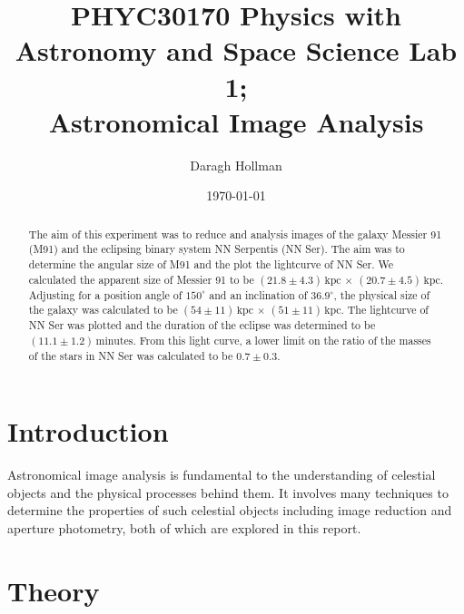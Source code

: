 \documentclass[%
reprint,
amsmath,amssymb,
aps,
]{revtex4-2}
\begin{document}
	
	
	\title{PHYC30170 Physics with Astronomy and Space Science Lab 1;\\Astronomical Image Analysis}%
	
	\author{Daragh Hollman}
	
	\date{\today}
	
	\begin{abstract}
		The aim of this experiment was to reduce and analysis images of the galaxy Messier 91 (M91) and the eclipsing binary system NN Serpentis (NN Ser). The aim was to determine the angular size of M91 and the plot the lightcurve of NN Ser. We calculated the apparent size of Messier 91 to be $\left(21.8 \pm 4.3\right) \,\text{kpc}$ $\times$ $\left(20.7 \pm 4.5\right) \,\text{kpc}$. Adjusting for a position angle of $150^\circ$ and an inclination of $36.9^\circ$, the physical size of the galaxy was calculated to be $\left(54 \pm 11\right) \,\text{kpc}$ $\times$ $\left(51 \pm 11\right) \,\text{kpc}$. The lightcurve of NN Ser was plotted and the duration of the eclipse was determined to be $(11.1 \pm 1.2)\,\text{minutes}$. From this light curve, a lower limit on the ratio of the masses of the stars in NN Ser was calculated to be $0.7 \pm 0.3$.
	\end{abstract}

	\maketitle
	
	\section{Introduction}

		Astronomical image analysis is fundamental to the understanding of celestial objects and the physical processes behind them. It involves many techniques to determine the properties of such celestial objects including image reduction and aperture photometry, both of which are explored in this report.
	
	
	\section{Theory}
\end{document}
